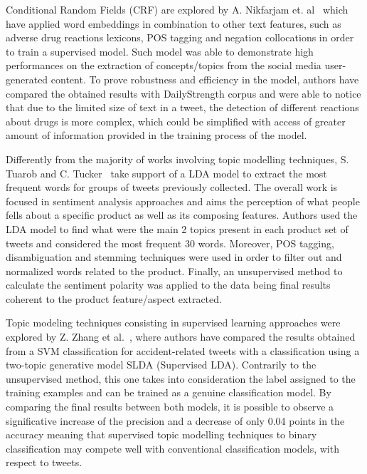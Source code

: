Conditional Random Fields (CRF) are explored by A. Nikfarjam et. al~\cite{nikfarjam2015pharmacovigilance} which have applied word embeddings in combination to other text features, such as adverse drug reactions lexicons, POS tagging and negation collocations in order to train a supervised model. Such model was able to demonstrate high performances on the extraction of concepts/topics from the social media user-generated content. To prove robustness and efficiency in the model, authors have compared the obtained results with DailyStrength corpus and were able to notice that due to the limited size of text in a tweet, the detection of different reactions about drugs is more complex, which could be simplified with access of greater amount of information provided in the training process of the model.

Differently from the majority of works involving topic modelling techniques, S. Tuarob and C. Tucker~\cite{tuarob2015quantifying} take support of a LDA model to extract the most frequent words for groups of tweets previously collected. The overall work is focused in sentiment analysis approaches and aims the perception of what people fells about a specific product as well as its composing features. Authors used the LDA model to find what were the main 2 topics present in each product set of tweets and considered the most frequent 30 words. Moreover, POS tagging, disambiguation and stemming techniques were used in order to filter out and normalized words related to the product. Finally, an unsupervised method to calculate the sentiment polarity was applied to the data being final results coherent to the product feature/aspect extracted.

Topic modeling techniques consisting in supervised learning approaches were explored by Z. Zhang et al.~\cite{zhang2016mining}, where authors have compared the results obtained from a SVM classification for accident-related tweets with a classification using a two-topic generative model SLDA (Supervised LDA). Contrarily to the unsupervised method, this one takes into consideration the label assigned to the training examples and can be trained as a genuine classification model. By comparing the final results between both models, it is possible to observe a significative increase of the precision and a decrease of only 0.04 points in the accuracy meaning that supervised topic modelling techniques to binary classification may compete well with conventional classification models, with respect to tweets.

